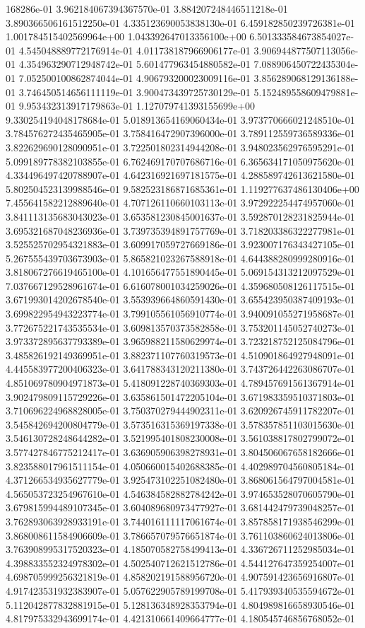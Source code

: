 168286e-01	3.962184067394367570e-01	3.884207248446511218e-01	3.890366506161512250e-01	4.335123690053838130e-01	6.459182850239726381e-01	1.001784515402569964e+00	1.043392647013356100e+00	6.501333584673854027e-01	4.545048889772176914e-01	4.011738187966906177e-01	3.906944877507113056e-01	4.354963290712948742e-01	5.601477963454880582e-01	7.088906450722435304e-01	7.052500100862874044e-01	4.906793200023009116e-01	3.856289068129136188e-01	3.746450514656111119e-01	3.900473439725730129e-01	5.152489558609479881e-01	9.953432313917179863e-01	1.127079741393155699e+00	9.330254194048178684e-01	5.018913654169060434e-01	3.973770666021248510e-01	3.784576272435465905e-01	3.758416472907396000e-01	3.789112559736589336e-01	3.822629690128090951e-01	3.722501802314944208e-01	3.948023562976595291e-01	5.099189778382103855e-01	6.762469170707686716e-01	6.365634171050975620e-01	4.334496497420788907e-01	4.642316921697181575e-01	4.288589742613621580e-01	5.802504523139988546e-01	9.582523186871685361e-01	1.119277637486130406e+00	7.455641582212889640e-01	4.707126110660103113e-01	3.972922254474957060e-01	3.841113135683043023e-01	3.653581230845001637e-01	3.592870128231825944e-01	3.695321687048236936e-01	3.739735394891757769e-01	3.718203386322277981e-01	3.525525702954321883e-01	3.609917059727669186e-01	3.923007176343427105e-01	5.267555439703673903e-01	5.865821023267588918e-01	4.644388280999280916e-01	3.818067276619465100e-01	4.101656477551890445e-01	5.069154313212097529e-01	7.037667129528961674e-01	6.616078001034259026e-01	4.359680508126117515e-01	3.671993014202678540e-01	3.553939664860591430e-01	3.655423950387409193e-01	3.699822954943223774e-01	3.799105561056910774e-01	3.940091055271958687e-01	3.772675221743535534e-01	3.609813570373582858e-01	3.753201145052740273e-01	3.973372895637793389e-01	3.965988211580629974e-01	3.723218752125084796e-01	3.485826192149369951e-01	3.882371107760319573e-01	4.510901864927948091e-01	4.445583977200406323e-01	3.641788343120211380e-01	3.743726442263086707e-01	4.851069780904971873e-01	5.418091228740369303e-01	4.789457691561367914e-01	3.902479809115729226e-01	3.635861501472205104e-01	3.671983359510371803e-01	3.710696224968828005e-01	3.750370279444902311e-01	3.620926745911782207e-01	3.545842694200804779e-01	3.573516315369197338e-01	3.578357851103015630e-01	3.546130728248644282e-01	3.521995401808230008e-01	3.561038817802799072e-01	3.577427846775212417e-01	3.636905906398278931e-01	3.804506067658182666e-01	3.823588017961511154e-01	4.050660015402688385e-01	4.402989704560805184e-01	4.371266534935627779e-01	3.925473102251082480e-01	3.868061564797004581e-01	4.565053723254967610e-01	4.546384582882784242e-01	3.974653528070605790e-01	3.679815994489107345e-01	3.604089680973477927e-01	3.681442479739048257e-01	3.762893063928933191e-01	3.744016111117061674e-01	3.857858171938546299e-01	3.868008611584906609e-01	3.786657079576651874e-01	3.761103860624013806e-01	3.763908995317520323e-01	4.185070582758499413e-01	4.336726711252985034e-01	4.398833552324978302e-01	4.502540712621512786e-01	4.544127647359254007e-01	4.698705999256321819e-01	4.858202191588956720e-01	4.907591423656916807e-01	4.917423531932383907e-01	5.057622905789199708e-01	5.417939340535594672e-01	5.112042877832881915e-01	5.128136348928353794e-01	4.804989816658930546e-01	4.817975332943699174e-01	4.421310661409664777e-01	4.180545746856768052e-01	